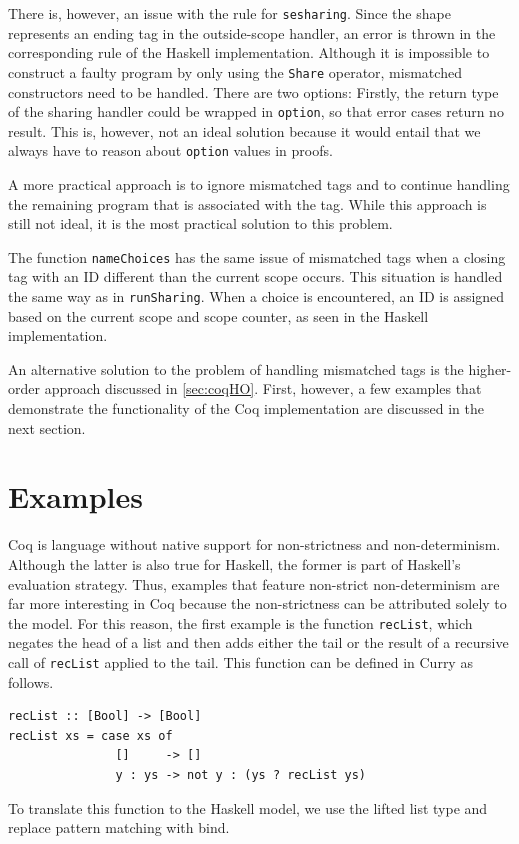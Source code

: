 \documentclass[a4paper, 11pt, fleqn, twoside, abstract=on]{scrreprt}
\newcommand{\hinl}[1]{\texttt{#1}}
\newcommand{\cinl}[1]{\texttt{#1}}
\begin{document}
There is, however, an issue with the rule for \cinl{sesharing}.
Since the shape represents an ending tag in the outside-scope handler, an error is thrown in the corresponding rule of the Haskell implementation.
Although it is impossible to construct a faulty program by only using the \cinl{Share} operator, mismatched constructors need to be handled.
There are two options: Firstly, the return type of the sharing handler could be wrapped in \cinl{option}, so that error cases return no result.
This is, however, not an ideal solution because it would entail that we always have to reason about \cinl{option} values in proofs.

A more practical approach is to ignore mismatched tags and to continue handling the remaining program that is associated with the tag.
While this approach is still not ideal, it is the most practical solution to this problem.

The function \cinl{nameChoices} has the same issue of mismatched tags when a closing tag with an ID different than the current scope occurs.
This situation is handled the same way as in \cinl{runSharing}.
When a choice is encountered, an ID is assigned based on the current scope and scope counter, as seen in the Haskell implementation.

An alternative solution to the problem of handling mismatched tags is the higher-order approach discussed in \autoref{sec:coqHO}.
First, however, a few examples that demonstrate the functionality of the Coq implementation are discussed in the next section.

\section{Examples}
Coq is language without native support for non-strictness and non-determinism.
Although the latter is also true for Haskell, the former is part of Haskell's evaluation strategy.
Thus, examples that feature non-strict non-determinism are far more interesting in Coq because the non-strictness can be attributed solely to the model.
For this reason, the first example is the function \hinl{recList}, which negates the head of a list and then adds either the tail or the result of a recursive call of \hinl{recList} applied to the tail.
This function can be defined in Curry as follows. 

\begin{verbatim}
recList :: [Bool] -> [Bool]
recList xs = case xs of
               []     -> []
               y : ys -> not y : (ys ? recList ys)
\end{verbatim}
\noindent
To translate this function to the Haskell model, we use the lifted list type and replace pattern matching with bind.
\end{document}
